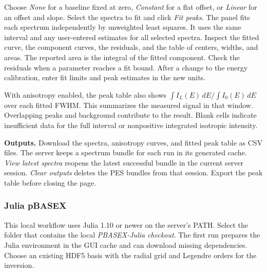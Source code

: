\documentclass[11pt,a4paper]{article}
\begin{document}
Choose \emph{None} for a baseline fixed at zero, \emph{Constant} for a
flat offset, or \emph{Linear} for an offset and slope. Select the spectra to fit and click
\emph{Fit peaks}. The panel fits each spectrum independently by unweighted
least squares. It uses the same interval and any user-entered estimates for
all selected spectra. Inspect the fitted curve,
the component curves, the residuals, and the table of centers, widths, and
areas. The reported area is the integral of the fitted component. Check
the residuals when a parameter reaches a fit bound. After a change to the
energy calibration, enter fit limits and peak estimates in the new units.

With anisotropy enabled, the peak table also shows
$\int I_L(E)\,dE/\int I_0(E)\,dE$ over each fitted FWHM. This summarizes
the measured signal in that window. Overlapping peaks and background
contribute to the result. Blank cells indicate insufficient data for
the full interval or nonpositive integrated isotropic intensity.

\textbf{Outputs.} Download the spectra, anisotropy curves, and fitted peak
table as CSV files.
The server keeps a spectrum bundle for each run in its generated cache.
\emph{View latest spectra} reopens the latest successful bundle in the
current server session. \emph{Clear outputs} deletes the PES bundles from
that session. Export the peak table before closing the page.

\subsubsection{Julia pBASEX}

This local workflow uses Julia 1.10 or newer on the server's PATH.
Select the folder that contains the local \emph{PBASEX-Julia checkout}.
The first run prepares the Julia environment in the GUI cache and can
download missing dependencies. Choose an existing HDF5 basis with the
radial grid and Legendre orders for the inversion.
\end{document}
